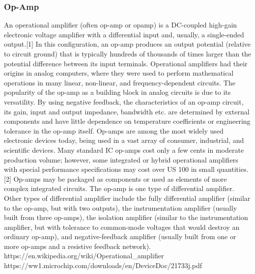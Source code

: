 \subsubsection{Op-Amp}
An operational amplifier (often op-amp or opamp) is a DC-coupled high-gain electronic voltage amplifier with a differential input and, usually, a single-ended output.[1] In this configuration, an op-amp produces an output potential (relative to circuit ground) that is typically hundreds of thousands of times larger than the potential difference between its input terminals. Operational amplifiers had their origins in analog computers, where they were used to perform mathematical operations in many linear, non-linear, and frequency-dependent circuits.
The popularity of the op-amp as a building block in analog circuits is due to its versatility. By using negative feedback, the characteristics of an op-amp circuit, its gain, input and output impedance, bandwidth etc. are determined by external components and have little dependence on temperature coefficients or engineering tolerance in the op-amp itself.
Op-amps are among the most widely used electronic devices today, being used in a vast array of consumer, industrial, and scientific devices. Many standard IC op-amps cost only a few cents in moderate production volume; however, some integrated or hybrid operational amplifiers with special performance specifications may cost over US 100 in small quantities.[2] Op-amps may be packaged as components or used as elements of more complex integrated circuits.
The op-amp is one type of differential amplifier. Other types of differential amplifier include the fully differential amplifier (similar to the op-amp, but with two outputs), the instrumentation amplifier (usually built from three op-amps), the isolation amplifier (similar to the instrumentation amplifier, but with tolerance to common-mode voltages that would destroy an ordinary op-amp), and negative-feedback amplifier (usually built from one or more op-amps and a resistive feedback network).
https://en.wikipedia.org/wiki/Operational_amplifier
https://ww1.microchip.com/downloads/en/DeviceDoc/21733j.pdf


